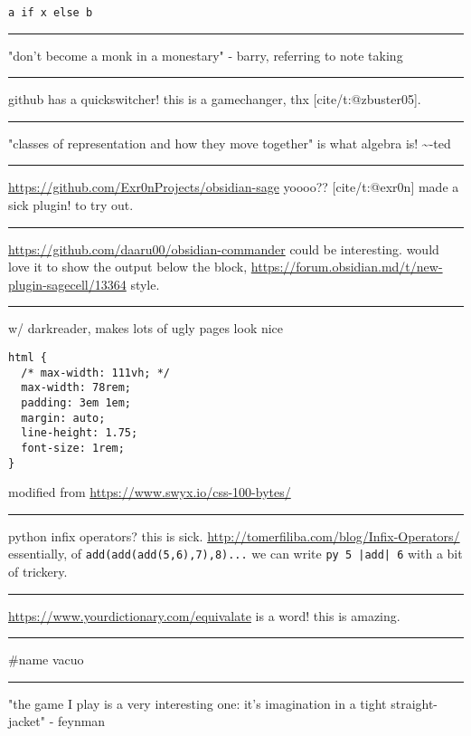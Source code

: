 \documentclass[letterpaper]{article}
\begin{document}
\begin{verbatim}
a if x else b
\end{verbatim}

\noindent\rule{\textwidth}{0.5pt}

"don't become a monk in a monestary" - barry, referring to note taking

\noindent\rule{\textwidth}{0.5pt}

github has a quickswitcher! this is a gamechanger, thx
[cite/t:@zbuster05].

\noindent\rule{\textwidth}{0.5pt}

"classes of representation and how they move together" is what algebra
is! \textasciitilde{}-ted

\noindent\rule{\textwidth}{0.5pt}

\url{https://github.com/Exr0nProjects/obsidian-sage} yoooo?? [cite/t:@exr0n]
made a sick plugin! to try out.

\noindent\rule{\textwidth}{0.5pt}

\url{https://github.com/daaru00/obsidian-commander} could be interesting.
would love it to show the output below the block,
\url{https://forum.obsidian.md/t/new-plugin-sagecell/13364} style.

\noindent\rule{\textwidth}{0.5pt}

w/ darkreader, makes lots of ugly pages look nice

\begin{verbatim}
html {
  /* max-width: 111vh; */
  max-width: 78rem;
  padding: 3em 1em;
  margin: auto;
  line-height: 1.75;
  font-size: 1rem;
}
\end{verbatim}

modified from \url{https://www.swyx.io/css-100-bytes/}

\noindent\rule{\textwidth}{0.5pt}

python infix operators? this is sick.
\url{http://tomerfiliba.com/blog/Infix-Operators/} essentially, of
\texttt{add(add(add(5,6),7),8)...} we can write \texttt{py 5 |add| 6} with a bit of
trickery.

\noindent\rule{\textwidth}{0.5pt}

\url{https://www.yourdictionary.com/equivalate} is a word! this is amazing.

\noindent\rule{\textwidth}{0.5pt}

\#name vacuo

\noindent\rule{\textwidth}{0.5pt}

"the game I play is a very interesting one: it's imagination in a tight
straight-jacket" - feynman
\end{document}
